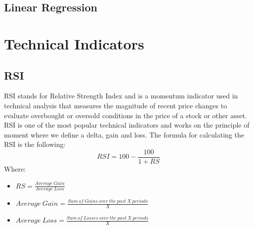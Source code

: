 \documentclass{imc-inf}
\begin{document}
		\subsection{Linear Regression}
	\section{Technical Indicators}
		\subsection{RSI}
			RSI stands for Relative Strength Index and is a momentum indicator used in technical analysis that measures the magnitude of recent price changes to
			evaluate overbought or oversold conditions in the price of a stock or other asset. RSI is one of the most popular technical indicators
			and works on the principle of moment where we define a delta, gain and loss. The formula for calculating the RSI is the following:
			\begin{equation}
				RSI = 100 - \frac{100}{1 + RS}
			\end{equation}
			Where:
			\begin{itemize}
				\item $RS = \frac{Average\ Gain}{Average\ Loss}$
				\item $Average\ Gain = \frac{Sum\ of\ Gains\ over\ the\ past\ X\ periods}{X}$
				\item $Average\ Loss = \frac{Sum\ of\ Losses\ over\ the\ past\ X\ periods}{X}$
			\end{itemize}
\end{document}
